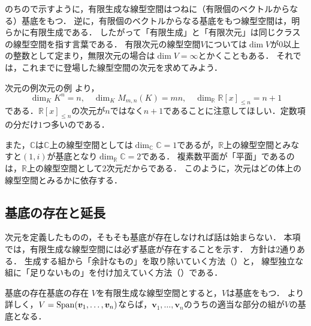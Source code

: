 のちので示すように，有限生成な線型空間はつねに（有限個のベクトルからなる）基底をもつ．
逆に，有限個のベクトルからなる基底をもつ線型空間は，明らかに有限生成である．
したがって「有限生成」と「有限次元」は同じクラスの線型空間を指す言葉である．
有限次元の線型空間$V$については$\dim V$が$0$以上の整数として定まり，無限次元の場合は$\dim V=\infty$とかくこともある．
それでは，これまでに登場した線型空間の次元を求めてみよう．

\begin{example}{次元の例}{次元の例}
  より，
  \[
    \dim_K K^n = n,
    \quad
    \dim_K M_{m,n}(K) = mn,
    \quad
    \dim_{\mathbb{R}} \mathbb{R}[x]_{\le n} = n + 1
  \]
  である．$\mathbb{R}[x]_{\le n}$の次元が$n$ではなく$n+1$であることに注意してほしい．定数項の分だけ$1$つ多いのである．

  また，$\mathbb{C}$は$\mathbb{C}$上の線型空間としては$\dim_{\mathbb{C}} \mathbb{C} = 1$であるが，$\mathbb{R}$上の線型空間とみなすと$(1, i)$が基底となり$\dim_{\mathbb{R}} \mathbb{C} = 2$である．
  複素数平面が「平面」であるのは，$\mathbb{R}$上の線型空間として$2$次元だからである．
  このように，次元はどの体上の線型空間とみるかに依存する．
\end{example}

\subsection{基底の存在と延長}

次元を定義したものの，そもそも基底が存在しなければ話は始まらない．
本項では，有限生成な線型空間には必ず基底が存在することを示す．
方針は$2$通りある．
生成する組から「余計なもの」を取り除いていく方法（）と，
線型独立な組に「足りないもの」を付け加えていく方法（）である．

\begin{theorem}{基底の存在}{基底の存在}
  $V$を有限生成な線型空間とすると，$V$は基底をもつ．
  より詳しく，$V = \operatorname{Span}(\bm{v}_1, \dots, \bm{v}_n)$ならば，$\bm{v}_1, \dots, \bm{v}_n$のうちの適当な部分の組が$V$の基底となる．
\end{theorem}

